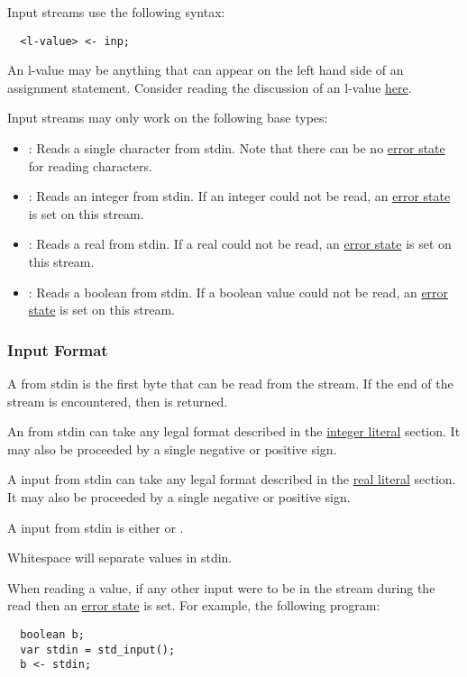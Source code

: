 \documentclass[streams.tex]{subfiles}
\begin{document}
Input streams use the following syntax:
\begin{lstlisting}
  <l-value> <- inp;
\end{lstlisting}

An l-value may be anything that can appear on the left hand side of an assignment statement.
Consider reading the discussion of an l-value
\href{https://en.wikipedia.org/wiki/Value_(computer_science)\#Assignment:_l-values_and_r-values}
{here}.

Input streams may only work on the following base types:
\begin{itemize}
  \item
    : Reads a single character from stdin. Note that there can be no
    \hyperref[sssec:stream_error]{error state} for reading characters.
  \item {}:
    Reads an integer from stdin. If an integer could not be read, an \hyperref[sssec:stream_error]
    {error state} is set on this stream.
  \item {}:
    Reads a real from stdin. If a real could not be read, an \hyperref[sssec:stream_error]{error
    state} is set on this stream.
  \item {}:
    Reads a boolean from stdin. If a boolean value could not be read, an
    \hyperref[sssec:stream_error]{error state} is set on this stream.
\end{itemize}

\subsubsection{Input Format}
\label{sssec:input_format}
A  from stdin is the first byte that can be read from the stream. If the end of the
stream is encountered, then  is returned.

An  from stdin can take any legal format described in the \hyperref[sssec:integer_lit]
{integer literal} section. It may also be proceeded by a single negative or positive sign.

A  input from stdin can take any legal format described in the \hyperref[sssec:real_lit]
{real literal} section. It may also be proceeded by a single negative or positive sign.

A  input from stdin is either  or .

Whitespace will separate values in stdin.

When reading a value, if any other input were to be in the stream during the read then an
\hyperref[sssec:stream_error]{error state} is set. For example, the following program:
\begin{lstlisting}
  boolean b;
  var stdin = std_input();
  b <- stdin;
\end{lstlisting}
\end{document}
